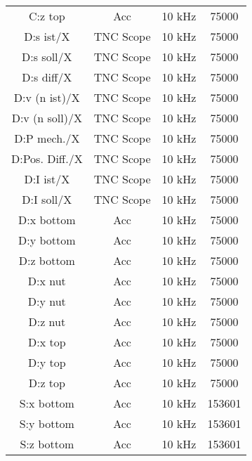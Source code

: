 \begin{center}
\begin{longtable}{c c c c}
 C:z top & Acc & 10 kHz & 75000 \\ 

 D:s ist/X & TNC Scope & 10 kHz & 75000 \\

 D:s soll/X & TNC Scope & 10 kHz & 75000 \\ 

 D:s diff/X & TNC Scope & 10 kHz & 75000 \\ 

 D:v (n ist)/X & TNC Scope & 10 kHz & 75000 \\ 

 D:v (n soll)/X & TNC Scope & 10 kHz & 75000 \\ 

 D:P mech./X & TNC Scope & 10 kHz & 75000 \\ 
 
 D:Pos. Diff./X & TNC Scope & 10 kHz & 75000 \\ 

 D:I ist/X & TNC Scope & 10 kHz & 75000 \\ 

 D:I soll/X & TNC Scope & 10 kHz & 75000 \\ 

 D:x bottom & Acc & 10 kHz & 75000 \\ 

 D:y bottom & Acc & 10 kHz & 75000 \\ 

 D:z bottom & Acc & 10 kHz & 75000 \\ 

 D:x nut & Acc & 10 kHz & 75000 \\ 

 D:y nut & Acc & 10 kHz & 75000 \\ 

 D:z nut & Acc & 10 kHz & 75000 \\ 

 D:x top & Acc & 10 kHz & 75000 \\

 D:y top & Acc & 10 kHz & 75000 \\ 

 D:z top & Acc & 10 kHz & 75000 \\ 

 S:x bottom & Acc & 10 kHz & 153601 \\ 

 S:y bottom & Acc & 10 kHz & 153601 \\ 

 S:z bottom & Acc & 10 kHz & 153601 \\ 


\end{longtable}
\end{center}
